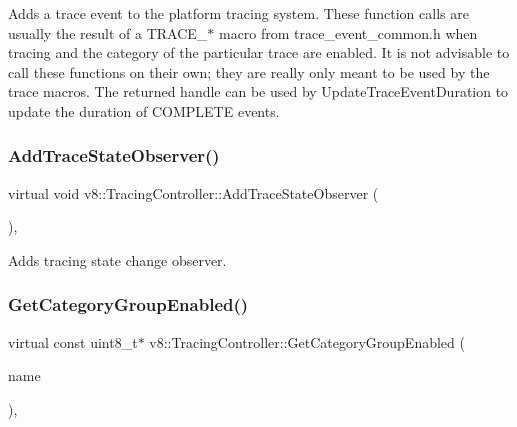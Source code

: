 Adds a trace event to the platform tracing system. These function calls are usually the result of a T\+R\+A\+C\+E\+\_\+$\ast$ macro from trace\+\_\+event\+\_\+common.\+h when tracing and the category of the particular trace are enabled. It is not advisable to call these functions on their own; they are really only meant to be used by the trace macros. The returned handle can be used by Update\+Trace\+Event\+Duration to update the duration of C\+O\+M\+P\+L\+E\+TE events. \mbox{\label{classv8_1_1TracingController_a7b86361ffadff46018a348fd2aa01061}} 
\subsubsection{\texorpdfstring{Add\+Trace\+State\+Observer()}{AddTraceStateObserver()}}
{\footnotesize\ttfamily virtual void v8\+::\+Tracing\+Controller\+::\+Add\+Trace\+State\+Observer (\begin{DoxyParamCaption}\item[{\mbox{\hyperlink{classv8_1_1TracingController_1_1TraceStateObserver}{Trace\+State\+Observer}} $\ast$}]{ }\end{DoxyParamCaption})\hspace{0.3cm}{\ttfamily [inline]}, {\ttfamily [virtual]}}

Adds tracing state change observer. \mbox{\label{classv8_1_1TracingController_af3c0fcec8fe93b18a89392686cfedfe5}} 
\subsubsection{\texorpdfstring{Get\+Category\+Group\+Enabled()}{GetCategoryGroupEnabled()}}
{\footnotesize\ttfamily virtual const uint8\+\_\+t$\ast$ v8\+::\+Tracing\+Controller\+::\+Get\+Category\+Group\+Enabled (\begin{DoxyParamCaption}\item[{const char $\ast$}]{name }\end{DoxyParamCaption})\hspace{0.3cm}{\ttfamily [inline]}, {\ttfamily [virtual]}}

